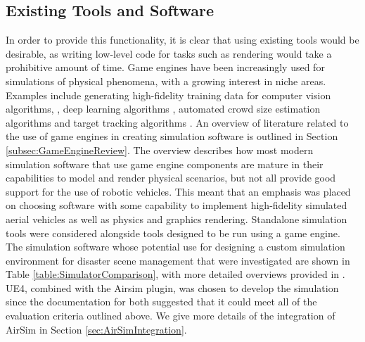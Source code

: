 \subsection{Existing Tools and Software}
In order to provide this functionality, it is clear that using existing tools would be desirable, as writing low-level code for tasks such as rendering would take a prohibitive amount of time. Game engines have been increasingly used for simulations of physical phenomena, with a growing interest in niche areas. Examples include generating high-fidelity training data for computer vision algorithms, \cite{Qiu2016UnrealCV:Engine}, deep learning algorithms \cite{Gaidon2016VirtualAnalysis}, automated crowd size estimation algorithms \cite{Lee2018DigitalCrowds} and target tracking algorithms \cite{Mueller2016ATracking}. An overview of literature related to the use of game engines in creating simulation software is outlined in Section \ref{subsec:GameEngineReview}. The overview describes how most modern simulation software that use game engine components are mature in their capabilities to model and render physical scenarios, but not all provide good support for the use of robotic vehicles.
This meant that an emphasis was placed on choosing software with some capability to implement high-fidelity simulated aerial vehicles as well as physics and graphics rendering.
Standalone simulation tools were considered alongside tools designed to be run using a game engine. The simulation software whose potential use for designing a custom simulation environment for disaster scene management that were investigated are shown in Table \ref{table:SimulatorComparison}, with more detailed overviews provided in \cite{Ebeid2018ASimulators}. UE4, combined with the Airsim plugin, was chosen to develop the simulation since the documentation for both suggested that it could meet all of the evaluation criteria outlined above. We give more details of the integration of AirSim in Section \ref{sec:AirSimIntegration}.\par
